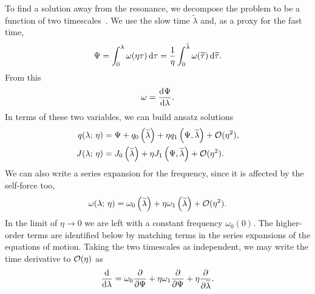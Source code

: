 To find a solution away from the resonance, we decompose the problem to be a function of two timescales~\cite{Kevorkian1971}. We use the slow time $\widetilde{\lambda}$ and, as a proxy for the fast time,
\begin{equation}
\Psi = \int_{0}^{\lambda}{\omega(\eta\tau)}\,\mathrm{d}{\tau} = \frac{1}{\eta}\int_{0}^{\tilde{\lambda}}{\omega(\widetilde{\tau})}\,\mathrm{d}{\widetilde{\tau}}.
\end{equation}
From this
\begin{equation}
\omega = \dfrac{\mathrm{d} {\Psi}}{\mathrm{d} {\lambda}}.
\end{equation}
In terms of these two variables, we can build ansatz solutions
\begin{subequations}
\begin{align}
\label{eq:q-series}
q(\lambda;\,\eta) = {} & \Psi + q_0\left(\widetilde{\lambda}\right) + \eta q_1\left(\Psi,\widetilde{\lambda}\right) + \mathcal{O}({\eta^2}), \\
J(\lambda;\,\eta) = {} & J_0\left(\widetilde{\lambda}\right) + \eta J_1\left(\Psi,\widetilde{\lambda}\right) + \mathcal{O}({\eta^2}).
\label{eq:J-series}
\end{align}
\end{subequations}
We can also write a series expansion for the frequency, since it is affected by the self-force too,
\begin{equation}
\omega(\lambda;\,\eta) = \omega_0\left(\widetilde{\lambda}\right) + \eta \omega_1\left(\widetilde{\lambda}\right) + \mathcal{O}({\eta^2}).
\end{equation}
In the limit of $\eta \rightarrow 0$ we are left with a constant frequency $\omega_0(0)$. The higher-order terms are identified below by matching terms in the series expansions of the equations of motion. Taking the two timescales as independent, we may write the time derivative to $\mathcal{O}({\eta})$ as
\begin{equation}
\dfrac{\mathrm{d}}{\mathrm{d} {\lambda}} = \omega_0\dfrac{\partial}{\partial {\Psi}} + \eta\omega_1\dfrac{\partial}{\partial {\Psi}} + \eta\dfrac{\partial}{\partial {\widetilde{\lambda}}}.
\end{equation}


